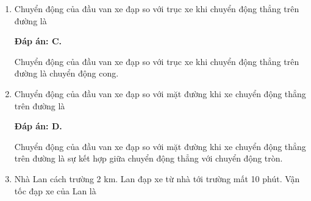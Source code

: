 \begin{enumerate}[label=\bfseries Câu \arabic*:]
{	}
	\item {}
	
	
	{Chuyển động của đầu van xe đạp so với trục xe khi chuyển động thẳng trên đường là
		
		
	}
	
	\hideall
	{\textbf{Đáp án: C.}
		
		Chuyển động của đầu van xe đạp so với trục xe khi chuyển động thẳng trên đường là chuyển động cong.
		
	}
	\item {}
	
	
	{Chuyển động của đầu van xe đạp so với mặt đường khi xe chuyển động thẳng trên đường là
		
		
	}
	
	\hideall
	{\textbf{Đáp án: D.}
		
		Chuyển động của đầu van xe đạp so với mặt đường khi xe chuyển động thẳng trên đường là sự kết hợp giữa chuyển động thẳng với chuyển động tròn.	
	}
	\item {}
	
	
	{Nhà Lan cách trường 2 km. Lan đạp xe từ nhà tới trường mất 10 phút. Vận tốc đạp xe của Lan là
		
		
	}
	

\end{enumerate}
